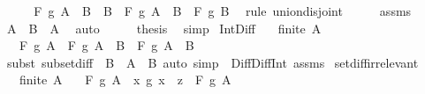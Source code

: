\begin{isabellebody}
\ \ \isamarkupfalse%
\ \isamarkupfalse%
\ {\isachardoublequoteopen}F\ g\ {\isacharparenleft}{\kern0pt}A\ {\isacharminus}{\kern0pt}\ B\ {\isasymunion}\ B{\isacharparenright}{\kern0pt}\ {\isacharequal}{\kern0pt}\ F\ g\ {\isacharparenleft}{\kern0pt}A\ {\isacharminus}{\kern0pt}\ B{\isacharparenright}{\kern0pt}\ \isactrlbold {\isacharasterisk}{\kern0pt}\ F\ g\ B{\isachardoublequoteclose}\ \isamarkupfalse%
\ {\isacharparenleft}{\kern0pt}rule\ union{\isacharunderscore}{\kern0pt}disjoint{\isacharparenright}{\kern0pt}\isanewline
\ \ \isamarkupfalse%
\ \isamarkupfalse%
\ assms\ \isamarkupfalse%
\ {\isachardoublequoteopen}A\ {\isasymunion}\ B\ {\isacharequal}{\kern0pt}\ A{\isachardoublequoteclose}\ \isamarkupfalse%
\ auto\isanewline
\ \ \isamarkupfalse%
\ \isamarkupfalse%
\ {\isacharquery}{\kern0pt}thesis\ \isamarkupfalse%
\ simp\isanewline
{}\isamarkupfalse%
%
\endisatagproof
{\isafoldproof}%
%
\isadelimproof
\isanewline
%
\endisadelimproof
\isanewline
{}\isamarkupfalse%
\ Int{\isacharunderscore}{\kern0pt}Diff{\isacharcolon}{\kern0pt}\isanewline
\ \ \ {\isachardoublequoteopen}finite\ A{\isachardoublequoteclose}\isanewline
\ \ \ {\isachardoublequoteopen}F\ g\ A\ {\isacharequal}{\kern0pt}\ F\ g\ {\isacharparenleft}{\kern0pt}A\ {\isasyminter}\ B{\isacharparenright}{\kern0pt}\ \isactrlbold {\isacharasterisk}{\kern0pt}\ F\ g\ {\isacharparenleft}{\kern0pt}A\ {\isacharminus}{\kern0pt}\ B{\isacharparenright}{\kern0pt}{\isachardoublequoteclose}\isanewline
%
\isadelimproof
\ \ %
\endisadelimproof
%
\isatagproof
{}\isamarkupfalse%
\ {\isacharparenleft}{\kern0pt}subst\ subset{\isacharunderscore}{\kern0pt}diff\ {\isacharbrackleft}{\kern0pt}\ B\ {\isacharequal}{\kern0pt}\ {\isachardoublequoteopen}A\ {\isacharminus}{\kern0pt}\ B{\isachardoublequoteclose}{\isacharbrackright}{\kern0pt}{\isacharparenright}{\kern0pt}\ {\isacharparenleft}{\kern0pt}auto\ simp{\isacharcolon}{\kern0pt}\ \ Diff{\isacharunderscore}{\kern0pt}Diff{\isacharunderscore}{\kern0pt}Int\ assms{\isacharparenright}{\kern0pt}%
\endisatagproof
{\isafoldproof}%
%
\isadelimproof
\isanewline
%
\endisadelimproof
\isanewline
{}\isamarkupfalse%
\ setdiff{\isacharunderscore}{\kern0pt}irrelevant{\isacharcolon}{\kern0pt}\isanewline
\ \ \ {\isachardoublequoteopen}finite\ A{\isachardoublequoteclose}\isanewline
\ \ \ {\isachardoublequoteopen}F\ g\ {\isacharparenleft}{\kern0pt}A\ {\isacharminus}{\kern0pt}\ {\isacharbraceleft}{\kern0pt}x{\isachardot}{\kern0pt}\ g\ x\ {\isacharequal}{\kern0pt}\ z{\isacharbraceright}{\kern0pt}{\isacharparenright}{\kern0pt}\ {\isacharequal}{\kern0pt}\ F\ g\ A{\isachardoublequoteclose}\isanewline

\end{isabellebody}
